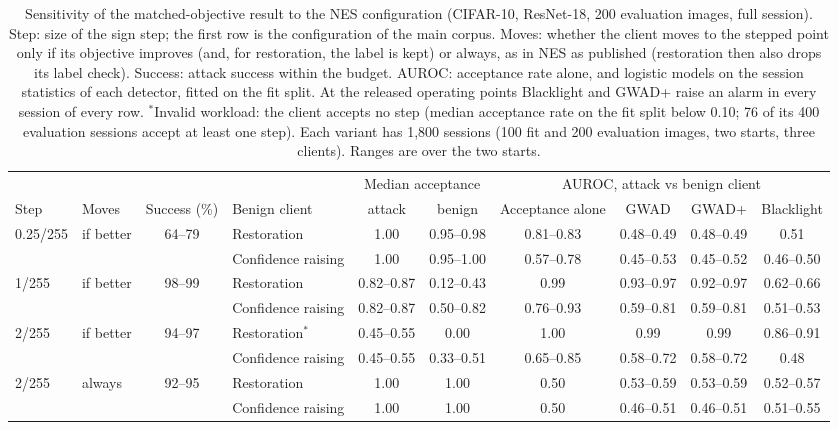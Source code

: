 \begin{table}[!tbp]
\centering\footnotesize\setlength{\tabcolsep}{3pt}
\caption{Sensitivity of the matched-objective result to the NES configuration (CIFAR-10, ResNet-18, 200 evaluation images, full session). Step: size of the sign step; the first row is the configuration of the main corpus. Moves: whether the client moves to the stepped point only if its objective improves (and, for restoration, the label is kept) or always, as in NES as published (restoration then also drops its label check). Success: attack success within the budget. AUROC: acceptance rate alone, and logistic models on the session statistics of each detector, fitted on the fit split. At the released operating points Blacklight and GWAD+ raise an alarm in every session of every row. $^{\ast}$Invalid workload: the client accepts no step (median acceptance rate on the fit split below 0.10; 76 of its 400 evaluation sessions accept at least one step). Each variant has 1{,}800 sessions (100 fit and 200 evaluation images, two starts, three clients). Ranges are over the two starts.}
\label{tab:nes}
\vspace{3pt}
\begin{adjustbox}{max width=\textwidth}
\begin{tabular}{llclcccccc}
\toprule
& & & & \multicolumn{2}{c}{Median acceptance} & \multicolumn{4}{c}{AUROC, attack vs benign client} \\
\cmidrule(lr){5-6}\cmidrule(lr){7-10}
Step & Moves & Success (\%) & Benign client & attack & benign & Acceptance alone & GWAD & GWAD+ & Blacklight \\
\midrule
0.25/255 & if better & 64--79 & Restoration & 1.00 & 0.95--0.98 & 0.81--0.83 & 0.48--0.49 & 0.48--0.49 & 0.51 \\
 &  &  & Confidence raising & 1.00 & 0.95--1.00 & 0.57--0.78 & 0.45--0.53 & 0.45--0.52 & 0.46--0.50 \\[2pt]
1/255 & if better & 98--99 & Restoration & 0.82--0.87 & 0.12--0.43 & 0.99 & 0.93--0.97 & 0.92--0.97 & 0.62--0.66 \\
 &  &  & Confidence raising & 0.82--0.87 & 0.50--0.82 & 0.76--0.93 & 0.59--0.81 & 0.59--0.81 & 0.51--0.53 \\[2pt]
2/255 & if better & 94--97 & Restoration$^{\ast}$ & 0.45--0.55 & 0.00 & 1.00 & 0.99 & 0.99 & 0.86--0.91 \\
 &  &  & Confidence raising & 0.45--0.55 & 0.33--0.51 & 0.65--0.85 & 0.58--0.72 & 0.58--0.72 & 0.48 \\[2pt]
2/255 & always & 92--95 & Restoration & 1.00 & 1.00 & 0.50 & 0.53--0.59 & 0.53--0.59 & 0.52--0.57 \\
 &  &  & Confidence raising & 1.00 & 1.00 & 0.50 & 0.46--0.51 & 0.46--0.51 & 0.51--0.55 \\
\bottomrule
\end{tabular}
\end{adjustbox}
\end{table}
